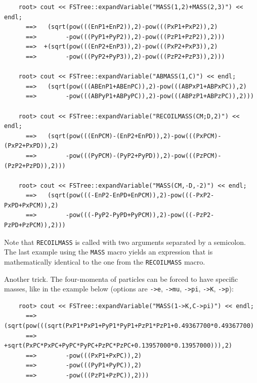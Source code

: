 \documentclass[11pt]{article}
\begin{document}
\begin{verbatim}
    root> cout << FSTree::expandVariable("MASS(1,2)+MASS(2,3)") << endl;
      ==>   (sqrt(pow(((EnP1+EnP2)),2)-pow(((PxP1+PxP2)),2)
      ==>        -pow(((PyP1+PyP2)),2)-pow(((PzP1+PzP2)),2)))
      ==>  +(sqrt(pow(((EnP2+EnP3)),2)-pow(((PxP2+PxP3)),2)
      ==>        -pow(((PyP2+PyP3)),2)-pow(((PzP2+PzP3)),2)))

    root> cout << FSTree::expandVariable("ABMASS(1,C)") << endl;
      ==>   (sqrt(pow(((ABEnP1+ABEnPC)),2)-pow(((ABPxP1+ABPxPC)),2)
      ==>        -pow(((ABPyP1+ABPyPC)),2)-pow(((ABPzP1+ABPzPC)),2)))

    root> cout << FSTree::expandVariable("RECOILMASS(CM;D,2)") << endl;
      ==>   (sqrt(pow(((EnPCM)-(EnP2+EnPD)),2)-pow(((PxPCM)-(PxP2+PxPD)),2)
      ==>        -pow(((PyPCM)-(PyP2+PyPD)),2)-pow(((PzPCM)-(PzP2+PzPD)),2)))

    root> cout << FSTree::expandVariable("MASS(CM,-D,-2)") << endl;
      ==>   (sqrt(pow(((-EnP2-EnPD+EnPCM)),2)-pow(((-PxP2-PxPD+PxPCM)),2)
      ==>        -pow(((-PyP2-PyPD+PyPCM)),2)-pow(((-PzP2-PzPD+PzPCM)),2)))
\end{verbatim}
Note that {\tt RECOILMASS} is called with two arguments separated by a semicolon. The last example using the {\tt MASS} macro yields an expression that is mathematically identical to the one from the {\tt RECOILMASS} macro.

Another trick.  The four-momenta of particles can be forced to have specific masses, like in the example below (options are {\tt ->e}, {\tt ->mu}, {\tt ->pi}, {\tt ->K}, {\tt ->p}):
\begin{verbatim}
    root> cout << FSTree::expandVariable("MASS(1->K,C->pi)") << endl;
      ==>   (sqrt(pow(((sqrt(PxP1*PxP1+PyP1*PyP1+PzP1*PzP1+0.49367700*0.49367700)
      ==>              +sqrt(PxPC*PxPC+PyPC*PyPC+PzPC*PzPC+0.13957000*0.13957000))),2)
      ==>        -pow(((PxP1+PxPC)),2)
      ==>        -pow(((PyP1+PyPC)),2)
      ==>        -pow(((PzP1+PzPC)),2)))
\end{verbatim}
\end{document}
